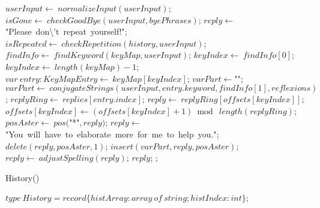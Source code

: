 \documentclass[a4paper,10pt]{article}
\begin{document}
\begin{algorithm}
\begin{algorithmic}[5]
    \STATE {}
    \STATE \(userInput\gets\ normalizeInput(userInput)\);
    \STATE \(isGone\gets\ checkGoodBye(userInput,byePhrases)\);
      \STATE \(reply\gets\)"{}Please\ don\textbackslash{}'{}t\ repeat\ yourself!"{}\(\);
      \STATE \(isRepeated\gets\ checkRepetition(history,userInput)\);
        \STATE \(findInfo\gets\ findKeyword(keyMap,userInput)\);
        \STATE \(keyIndex\gets\ findInfo[0]\);
          \STATE \(keyIndex\gets\ length(keyMap)-1\);
        \ENDIF
        \STATE \(var\ entry:KeyMapEntry\gets\ keyMap[keyIndex]\);
        \STATE \(varPart\gets\)"{}"{}\(\);
          \STATE \(varPart\gets\ conjugateStrings(userInput,entry.keyword,findInfo[1],reflexions)\);
        \ENDIF
        \STATE \(replyRing\gets\ replies[entry.index]\);
        \STATE \(reply\gets\ replyRing[offsets[keyIndex]]\);
        \STATE \(offsets[keyIndex]\gets(offsets[keyIndex]+1)\bmod\ length(replyRing)\);
        \STATE \(posAster\gets\ pos(\)"{}*"{}\(,reply)\);
            \STATE \(reply\gets\)"{}You\ will\ have\ to\ elaborate\ more\ for\ me\ to\ help\ you."{}\(\);
          \ELSE
            \STATE \(delete(reply,posAster,1)\);
            \STATE \(insert(varPart,reply,posAster)\);
          \ENDIF
        \ENDIF
        \STATE \(reply\gets\ adjustSpelling(reply)\);
      \ENDIF
      \PRINT\(reply\);
    \ENDIF
  ;

\end{algorithmic}
\end{algorithm}


\begin{algorithm}
\caption{History()}
\begin{algorithmic}[5]

\STATE {}
  \STATE {}
  \STATE {}
  \STATE {}
  \STATE {}
  \STATE {}
  \STATE {}
  \STATE \(type\ History=record\{histArray:array\ of\ string;histIndex:int\}\);

\end{algorithmic}
\end{algorithm}
\end{document}
